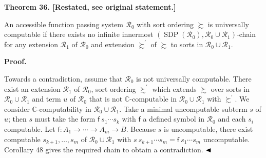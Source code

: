 \documentclass[10pt,a4paper]{amsart}
\begin{document}
 
 
 
\par\medskip\noindent\textbf{Theorem 36. [Restated, see original statement.]}\par
 
 
An accessible function passing system $\mathcal{R}_{0}$ with sort ordering $\succsim$ is universally computable if there exists no infinite innermost $(\operatorname{SDP}(\mathcal{R}_{0}),\mathcal{R}_{0}\cup\mathcal{R}_{1})$-chain for any extension $\mathcal{R}_{1}$ of $\mathcal{R}_{0}$ and extension $\succsim^{\prime}$ of $\succsim$ to sorts in $\mathcal{R}_{0}\cup\mathcal{R}_{1}$.\par
 
 
 
 
 
 
\par\medskip\noindent\textbf{Proof.}\par
 
 
Towards a contradiction, assume that $\mathcal{R}_{0}$ is not universally computable. There exist an extension $\mathcal{R}_{1}$ of $\mathcal{R}_{0}$, sort ordering $\succsim^{\prime}$ which extends $\succsim$ over sorts in $\mathcal{R}_{0}\cup\mathcal{R}_{1}$ and term $u$ of $\mathcal{R}_{0}$ that is not $\mathbb{C}$-computable in $\mathcal{R}_{0}\cup\mathcal{R}_{1}$ with $\succsim^{\prime}$. We consider $\mathbb{C}$-computability in $\mathcal{R}_{0}\cup\mathcal{R}_{1}$. Take a minimal uncomputable subterm $s$ of $u$; then $s$ must take the form ${\mathsf{f}}\ {{s}_{1}\cdots{s}_{k}}$ with $\mathsf{f}$ a defined symbol in $\mathcal{R}_{0}$ and each $s_{i}$ computable. Let $\mathsf{f}:{A}_{1}\rightarrow\cdots\rightarrow{A}_{m}\rightarrow B$. Because $s$ is uncomputable, there exist computable ${s}_{k+1},\ldots,{s}_{m}$ of $\mathcal{R}_{0}\cup\mathcal{R}_{1}$ with ${s}\ {{s}_{k+1}\cdots{s}_{m}}={\mathsf{f}}\ {{s}_{1}\cdots{s}_{m}}$ uncomputable. Corollary 48 gives the required chain to obtain a contradiction. $\hfill\blacktriangleleft$\par
 
\end{document}
